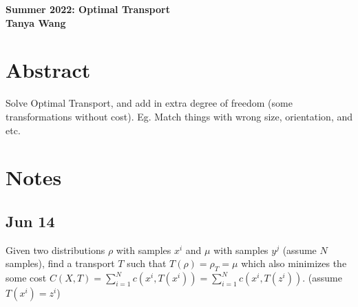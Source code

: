\documentclass[11pt]{article}
\begin{document}
\begin{center}
\vspace*{-2cm}

\end{center}
\vspace*{.5cm}
\begin{center}
\large \textbf{%
Summer 2022: Optimal Transport}\\
\large \textbf{%
Tanya Wang}\\
\end{center}

\section{Abstract}
Solve Optimal Transport, and add in extra degree of freedom (some transformations without cost). Eg. Match things with wrong size, orientation, and etc.

\section{Notes}
\subsection{Jun 14}
Given two distributions $\rho$ with samples $x^i$ and $\mu$ with samples $y^j$ (assume $N$ samples), find a transport $T$ such that $T(\rho) = \rho_T = \mu$ which also minimizes the some cost $C(X,T) = \sum_{i=1}^N c(x^i, T(x^i)) = \sum_{i=1}^N c(x^i, T(z^i))$. (assume $T(x^i) = z^i$)
\end{document}

